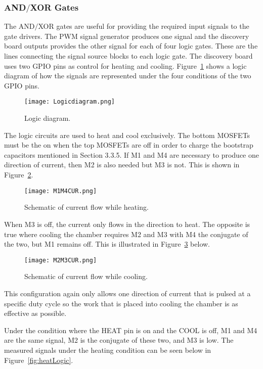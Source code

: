 \documentclass[11pt,letter]{article}
\begin{document}
\subsubsection{AND$/$XOR Gates} %

The AND$/$XOR gates are useful for providing the required input signals to the gate drivers. The PWM signal generator produces one signal and the discovery board outputs provides the other signal for each of four logic gates. These are the lines connecting the signal source blocks to each logic gate. The discovery board uses two GPIO pins as control for heating and cooling. Figure~\ref{fig:LogicDiagram} shows a logic diagram of how the signals are represented under the four conditions of the two GPIO pins.

\begin{figure}[H]
    \centering
    \texttt{[image: Logicdiagram.png]}
    \caption{Logic diagram.}
    \label{fig:LogicDiagram}
\end{figure}

The logic circuits are used to heat and cool exclusively. The bottom MOSFETs must be the on when the top MOSFETs are off in order to charge the bootstrap capacitors mentioned in Section 3.3.5. If M1 and M4 are necessary to produce one direction of current, then M2 is also needed but M3 is not. This is shown in Figure~\ref{fig:HEATCUR}. 

\begin{figure}[H]
    \centering
    \texttt{[image: M1M4CUR.png]}
    \caption{Schematic of current flow while heating.}
    \label{fig:HEATCUR}
\end{figure}

When M3 is off, the current only flows in the direction to heat. The opposite is true where cooling the chamber requires M2 and M3 with M4 the conjugate of the two, but M1 remains off. This is illustrated in Figure~\ref{fig:COOLCUR} below.

\begin{figure}[H]
    \centering
    \texttt{[image: M2M3CUR.png]}
    \caption{Schematic of current flow while cooling.}
    \label{fig:COOLCUR}
\end{figure}

This configuration again only allows one direction of current that is pulsed at a specific duty cycle so the work that is placed into cooling the chamber is as effective as possible. 

Under the condition where the HEAT pin is on and the COOL is off, M1 and M4 are the same signal, M2 is the conjugate of these two, and M3 is low. The measured signals under the heating condition can be seen below in Figure~\ref{fig:heatLogic}.
\end{document}
